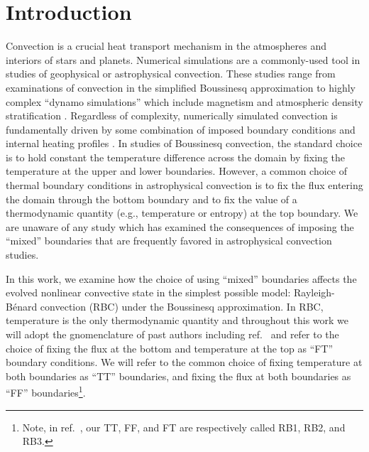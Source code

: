 \documentclass[aps, pre, onecolumn, nofootinbib, notitlepage, groupedaddress, amsfonts, amssymb, amsmath, longbibliography, superscriptaddress]{revtex4-1}
\newcommand{\RB}{Rayleigh-B\'{e}nard }
\newcommand{\ea}[1]{{\color{red} #1}}
\begin{document}

\section{Introduction}
\label{sec:introduction}
Convection is a crucial heat transport mechanism in the atmospheres and interiors of stars and planets.
Numerical simulations are a commonly-used tool in studies of geophysical or astrophysical convection.
These studies range from examinations of convection in the simplified Boussinesq approximation \cite{spiegel&veronis1960, ahlers&all2009, plumley&julien2019} to highly complex ``dynamo simulations'' which include magnetism and atmospheric density stratification \cite{charbonneau2014, toomre2019}.
Regardless of complexity, numerically simulated convection is fundamentally driven by some combination of imposed boundary conditions and internal heating profiles \cite{goluskin2016}.
In studies of Boussinesq convection, the standard choice is to hold constant the temperature difference across the domain by fixing the temperature at the upper and lower boundaries.
However, a common choice of thermal boundary conditions in astrophysical convection \cite{glatzmaier&gilman1982, hurlburt&all1986, cattaneo&all1990, featherstone&hindman2016a, korre&all2019, wood&brummell2018, kapyla&all2019} is to fix the flux entering the domain through the bottom boundary and to fix the value of a thermodynamic quantity (e.g., temperature or entropy) at the top boundary.
We are unaware of any study which has examined the consequences of imposing the ``mixed'' boundaries that are frequently favored in astrophysical convection studies.

In this work, we examine how the choice of using ``mixed'' boundaries affects the evolved nonlinear convective state in the simplest possible model: \RB convection (RBC) under the Boussinesq approximation.
In RBC, temperature is the only thermodynamic quantity and throughout this work we will \ea{adopt the gnomenclature of past authors including ref.~\cite{ishiwatari&all1994} and} refer to the choice of fixing the flux at the bottom and temperature at the top as ``FT'' boundary conditions.
We will refer to the common choice of fixing temperature at both boundaries as ``TT'' boundaries, and fixing the flux at both boundaries as ``FF'' boundaries\footnote{Note, in ref.~\cite{goluskin2016}, our TT, FF, and FT are respectively called RB1, RB2, and RB3.}.
\end{document}
